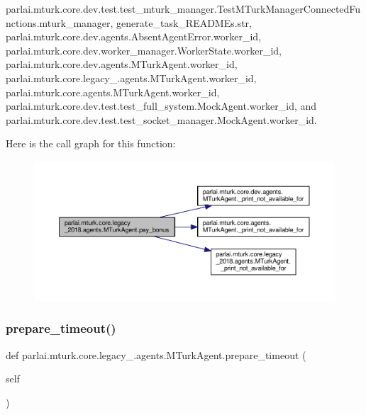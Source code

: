 parlai.\+mturk.\+core.\+dev.\+test.\+test\+\_\+mturk\+\_\+manager.\+Test\+M\+Turk\+Manager\+Connected\+Functions.\+mturk\+\_\+manager, generate\+\_\+task\+\_\+\+R\+E\+A\+D\+M\+Es.\+str, parlai.\+mturk.\+core.\+dev.\+agents.\+Absent\+Agent\+Error.\+worker\+\_\+id, parlai.\+mturk.\+core.\+dev.\+worker\+\_\+manager.\+Worker\+State.\+worker\+\_\+id, parlai.\+mturk.\+core.\+dev.\+agents.\+M\+Turk\+Agent.\+worker\+\_\+id, parlai.\+mturk.\+core.\+legacy\+\_.\+agents.\+M\+Turk\+Agent.\+worker\+\_\+id, parlai.\+mturk.\+core.\+agents.\+M\+Turk\+Agent.\+worker\+\_\+id, parlai.\+mturk.\+core.\+dev.\+test.\+test\+\_\+full\+\_\+system.\+Mock\+Agent.\+worker\+\_\+id, and parlai.\+mturk.\+core.\+dev.\+test.\+test\+\_\+socket\+\_\+manager.\+Mock\+Agent.\+worker\+\_\+id.

Here is the call graph for this function\+:
\nopagebreak
\begin{figure}[H]
\begin{center}
\leavevmode
\includegraphics[width=350pt]{classparlai_1_1mturk_1_1core_1_1legacy__2018_1_1agents_1_1MTurkAgent_ad5cc68dcd472181264b97cae8bb0f63e_cgraph}
\end{center}
\end{figure}
\mbox{\label{classparlai_1_1mturk_1_1core_1_1legacy__2018_1_1agents_1_1MTurkAgent_a8b3209004d4c83fdb11cacb82528e871}} 
\subsubsection{\texorpdfstring{prepare\+\_\+timeout()}{prepare\_timeout()}}
{\footnotesize\ttfamily def parlai.\+mturk.\+core.\+legacy\+\_.\+agents.\+M\+Turk\+Agent.\+prepare\+\_\+timeout (\begin{DoxyParamCaption}\item[{}]{self }\end{DoxyParamCaption})}

